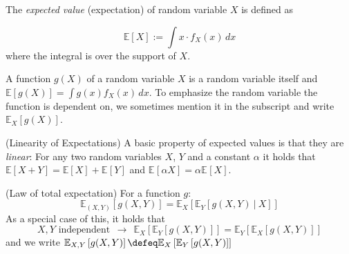 \documentclass[
	twoside=false, %
]{kaobook}
\begin{document}
\begin{definition}
  The \textit{expected value} (expectation) of random variable \(X\) is
  defined as
  
  \[ \mathbb{E}[X] := \int x \cdot
    f_X(x) \, dx
  \]
  where the integral is over the support of $X$. 
\end{definition}

  A function \(g(X)\) of a random variable \(X\) is a random variable itself and $\mathbb{E}[g(X)] = {\int g(x)f_X(x) \, dx}$. %
To emphasize the random
  variable the function is dependent on, we sometimes mention it in the
  subscript and write $\mathbb{E}_X[g(X)]$.

\begin{lemma} (Linearity of Expectations)
	A basic property of expected values is that they are \textit{linear}: For any two random variables $X$, $Y$ and a constant $\alpha$ it holds that $\mathbb{E}\left[ X + Y \right] = \mathbb{E}\left[ X \right] + \mathbb{E}_{}\left[ Y \right]$ and $\mathbb{E}_{}\left[ \alpha X \right] = \alpha \mathbb{E}_{}\left[ X \right]$.
\end{lemma}

\begin{lemma} (Law of total expectation)
  \label{thm:law-of-total-expectation}
  For a function $g$:
$$
\mathbb{E}_{(X,Y)}\left[ g(X,Y) \right] = \mathbb{E}_{X}\left[ \mathbb{E}_{Y}\left[ g(X,Y) ~|~ X \right]  \right] 
$$
As a special case of this, it holds that
$$
\text{$X,Y$ independent} ~ ~ \rightarrow ~ ~ 
\mathbb{E}_{X}\left[ \mathbb{E}_{Y}\left[ g(X,Y)  \right]  \right] 
=
\mathbb{E}_{Y}\left[ \mathbb{E}_{X}\left[ g(X,Y) \right]  \right] 
$$
and we write $\mathbb{E}_{X,Y}\left[ g(X,Y) \right] \defeq \mathbb{E}_{X}\left[ \mathbb{E}_{Y}\left[ g(X,Y) \right] \right]$
\end{lemma}

\end{document}

